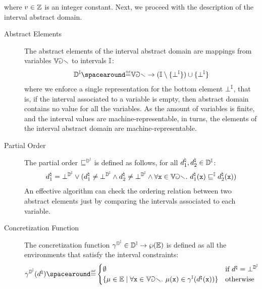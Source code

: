   where $v\in\mathbb{Z}$ is an integer constant.
  Next, we proceed with the description of the interval abstract domain.

  \begin{description}
    \item[Abstract Elements] The abstract elements of the interval abstract domain are mappings from variables $\mathbb{Var}$ to intervals $\mathbb{I}$:
    \begin{align*}
      \intervalabstractdomaintype \DefeQ \variables \to (\intervaltype \setminus \{\intervalbottom\}) \setjoin \{\intervalbottom\}
    \end{align*}
    where we enforce a single representation for the bottom element $\bot^{\mathbb{I}}$, that is, if the interval associated to a variable is empty, then abstract domain contains no value for all the variables.
    As the amount of variables is finite, and the interval values are machine-representable, in turns, the elements of the interval abstract domain are machine-representable.
    \item[Partial Order] The partial order $\sqsubseteq^{\mathbb{D}^{\mathbb{I}}}$ is defined as follows, for all $d^\natural_1, d^\natural_2 \in \mathbb{D}^{\mathbb{I}}$:
    \begin{align*}
      d^\natural_1 = \bot^{\mathbb{D}^{\mathbb{I}}} \lor (d^\natural_1 \neq \bot^{\mathbb{D}^{\mathbb{I}}} \land d^\natural_2 \neq \bot^{\mathbb{D}^{\mathbb{I}}} \land \forall \textup{\texttt{x}} \in \mathbb{Var}.~ d^\natural_1(\textup{\texttt{x}}) \sqsubseteq^{\mathbb{I}} d^\natural_2(\textup{\texttt{x}}))
    \end{align*}
    An effective algorithm can check the ordering relation between two abstract elements just by comparing the intervals associated to each variable.
    \item[Concretization Function] The concretization function $\gamma^{\mathbb{D}^{\mathbb{I}}}\in\mathbb{D}^{\mathbb{I}}\to\wp(\mathbb{E})$ is defined as all the environments that satisfy the interval constraints:
    \begin{align*}
      \intervalabstractdomainconcretization(\defabstractvalue) \DefeQ \begin{cases}
        \emptyset & \text{if } \defabstractvalue = \intervalabstractdomainbottom \\
        \setdef{\defenv\in\env}{\forall \defvariable \in \variables.\spacer \defenv(\defvariable) \in \intervalconcretization(\defabstractvalue(\defvariable))} & \text{otherwise}

\end{cases}
\end{align*}
\end{description}

